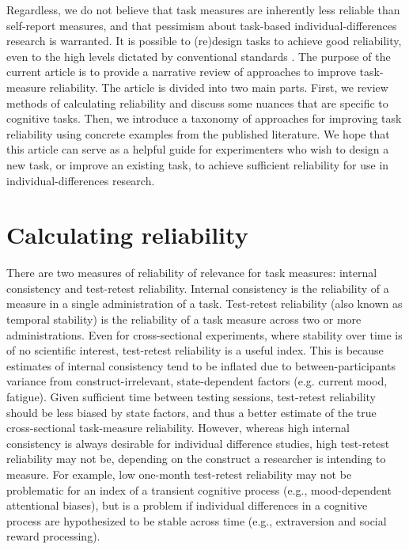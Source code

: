 \documentclass[a4paper,12pt]{article}
\begin{document}

Regardless, we do not believe that task measures are inherently less reliable than self-report measures, and that pessimism about task-based individual-differences research is warranted. It is possible to (re)design tasks to achieve good reliability, even to the high levels dictated by conventional standards \cite{waltmann2022sufficient, sullivan2022enhancing, kucina2022solution, snijder2022psychometric}. The purpose of the current article is to provide a narrative review of approaches to improve task-measure reliability. The article is divided into two main parts. First, we review methods of calculating reliability and discuss some nuances that are specific to cognitive tasks. Then, we introduce a taxonomy of approaches for improving task reliability using concrete examples from the published literature. We hope that this article can serve as a helpful guide for experimenters who wish to design a new task, or improve an existing task, to achieve sufficient reliability for use in individual-differences research.

\section{Calculating reliability}

There are two measures of reliability of relevance for task measures: internal consistency and test-retest reliability. Internal consistency is the reliability of a measure in a single administration of a task. Test-retest reliability (also known as temporal stability) is the reliability of a task measure across two or more administrations. Even for cross-sectional experiments, where stability over time is of no scientific interest, test-retest reliability is a useful index. This is because estimates of internal consistency tend to be inflated due to between-participants variance from construct-irrelevant, state-dependent factors (e.g. current mood, fatigue). Given sufficient time between testing sessions, test-retest reliability should be less biased by state factors, and thus a better estimate of the true cross-sectional task-measure reliability. However, whereas high internal consistency is always desirable for individual difference studies, high test-retest reliability may not be, depending on the construct a researcher is intending to measure. For example, low one-month test-retest reliability may not be problematic for an index of a transient cognitive process (e.g., mood-dependent attentional biases), but is a problem if individual differences in a cognitive process are hypothesized to be stable across time (e.g., extraversion and social reward processing).
\end{document}
